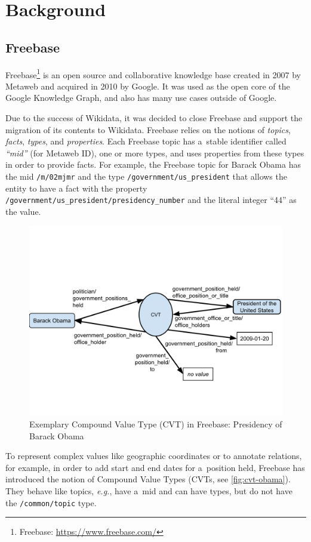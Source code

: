 \documentclass{sig-alternate}
\begin{document}
\section{Background}\label{sec:background}

\subsection{Freebase}

Freebase\footnote{Freebase: \url{https://www.freebase.com/}} is an open source and
collaborative knowledge base created in 2007 by Metaweb and acquired in 2010 by Google.
It was used as the open core of the Google Knowledge Graph,
and also has many use cases outside of Google.

Due to the success of Wikidata,
it was decided to close Freebase and support the migration of its contents to Wikidata.
Freebase relies on the notions of \emph{topics}, \emph{facts}, \emph{types}, and \emph{properties}.
Each Freebase topic has a~stable identifier called \emph{``mid''} (for Metaweb ID),
one or more types, and uses properties from these types in order to provide facts.
For example, the Freebase topic for Barack Obama has the mid \texttt{/m/02mjmr}
and the type \texttt{/government/us\_president} that allows the entity to have
a fact with the property \texttt{/government/us\_president/presidency\_number}
and the literal integer ``44'' as the value.

\begin{figure}[!htbp]
\centering
\includegraphics[trim=0cm 3cm 0cm 5cm, width=8.45 cm]{img/freebase-cvt-obama.pdf}
\caption{Exemplary Compound Value Type (CVT) in Freebase: Presidency of Barack Obama}
\label{fig:cvt-obama}
\end{figure}

To represent complex values like geographic coordinates or to annotate relations,
for example, in order to add start and end dates for a~position held,
Freebase has introduced the notion of Compound Value Types (CVTs, see \autoref{fig:cvt-obama}).
They behave like topics, \emph{e.g.}, have a~mid and can have types,
but do not have the \texttt{/common/topic} type.
\end{document}
